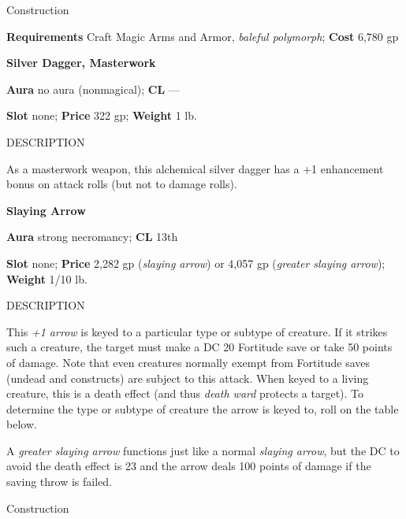 Construction
				
\textbf{Requirements} Craft Magic Arms and Armor, \textit{baleful polymorph}; \textbf{Cost }6,780 gp
				
\textbf{Silver Dagger, Masterwork}
				
\textbf{Aura} no aura (nonmagical); \textbf{CL} ---
				
\textbf{Slot} none; \textbf{Price} 322 gp; \textbf{Weight} 1 lb.
				
DESCRIPTION
				
As a masterwork weapon, this alchemical silver dagger has a +1 enhancement bonus on attack rolls (but not to damage rolls).
				
\textbf{Slaying Arrow}
				
\textbf{Aura} strong necromancy;\textbf{ CL }13th
				
\textbf{Slot} none; \textbf{Price} 2,282 gp (\textit{slaying arrow}) or 4,057 gp (\textit{greater slaying arrow}); \textbf{Weight} 1/10 lb.
				
DESCRIPTION
				
This \textit{+1 arrow} is keyed to a particular type or subtype of creature. If it strikes such a creature, the target must make a DC 20 Fortitude save or take 50 points of damage. Note that even creatures normally exempt from Fortitude saves (undead and constructs) are subject to this attack. When keyed to a living creature, this is a death effect (and thus \textit{death ward} protects a target). To determine the type or subtype of creature the arrow is keyed to, roll on the table below.
				
A \textit{greater slaying arrow} functions just like a normal \textit{slaying arrow}, but the DC to avoid the death effect is 23 and the arrow deals 100 points of damage if the saving throw is failed. 
				
Construction
				

